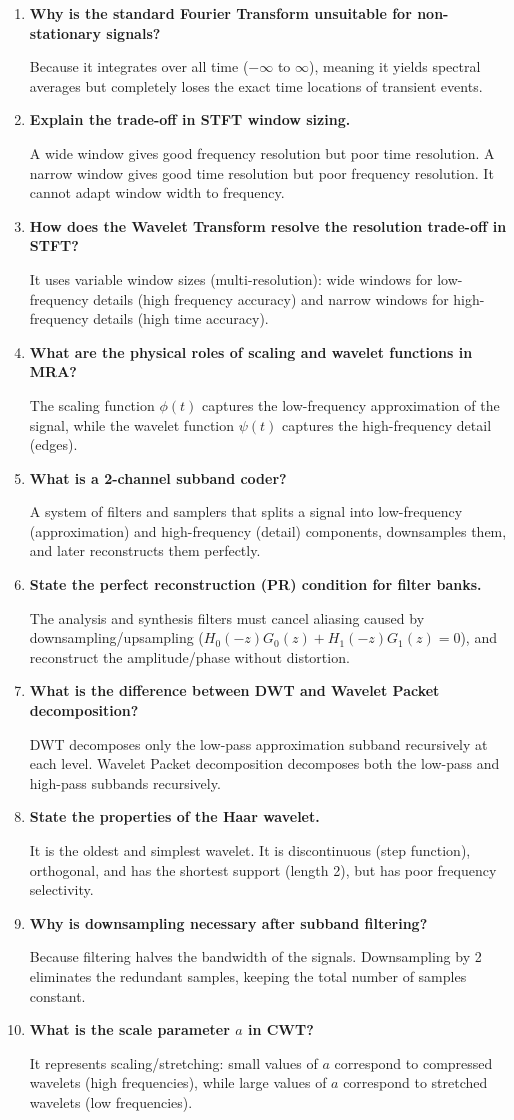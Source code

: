 \documentclass[12pt,a4paper]{article}
\newcommand{\Q}[1]{\textbf{#1}\par\noindent\ignorespaces}
\begin{document}
\begin{tcolorbox}[exambox, title={\textbf{Frequently Asked / Viva Questions}}]
\begin{enumerate}[leftmargin=*, itemsep=3.5pt, label=\arabic*.]
  \item \Q{Why is the standard Fourier Transform unsuitable for non-stationary signals?} Because it integrates over all time ($-\infty$ to $\infty$), meaning it yields spectral averages but completely loses the exact time locations of transient events.
  \item \Q{Explain the trade-off in STFT window sizing.} A wide window gives good frequency resolution but poor time resolution. A narrow window gives good time resolution but poor frequency resolution. It cannot adapt window width to frequency.
  \item \Q{How does the Wavelet Transform resolve the resolution trade-off in STFT?} It uses variable window sizes (multi-resolution): wide windows for low-frequency details (high frequency accuracy) and narrow windows for high-frequency details (high time accuracy).
  \item \Q{What are the physical roles of scaling and wavelet functions in MRA?} The scaling function $\phi(t)$ captures the low-frequency approximation of the signal, while the wavelet function $\psi(t)$ captures the high-frequency detail (edges).
  \item \Q{What is a 2-channel subband coder?} A system of filters and samplers that splits a signal into low-frequency (approximation) and high-frequency (detail) components, downsamples them, and later reconstructs them perfectly.
  \item \Q{State the perfect reconstruction (PR) condition for filter banks.} The analysis and synthesis filters must cancel aliasing caused by downsampling/upsampling ($H_0(-z)G_0(z) + H_1(-z)G_1(z) = 0$), and reconstruct the amplitude/phase without distortion.
  \item \Q{What is the difference between DWT and Wavelet Packet decomposition?} DWT decomposes only the low-pass approximation subband recursively at each level. Wavelet Packet decomposition decomposes both the low-pass and high-pass subbands recursively.
  \item \Q{State the properties of the Haar wavelet.} It is the oldest and simplest wavelet. It is discontinuous (step function), orthogonal, and has the shortest support (length 2), but has poor frequency selectivity.
  \item \Q{Why is downsampling necessary after subband filtering?} Because filtering halves the bandwidth of the signals. Downsampling by 2 eliminates the redundant samples, keeping the total number of samples constant.
  \item \Q{What is the scale parameter $a$ in CWT?} It represents scaling/stretching: small values of $a$ correspond to compressed wavelets (high frequencies), while large values of $a$ correspond to stretched wavelets (low frequencies).
\end{enumerate}
\end{tcolorbox}
\end{document}
